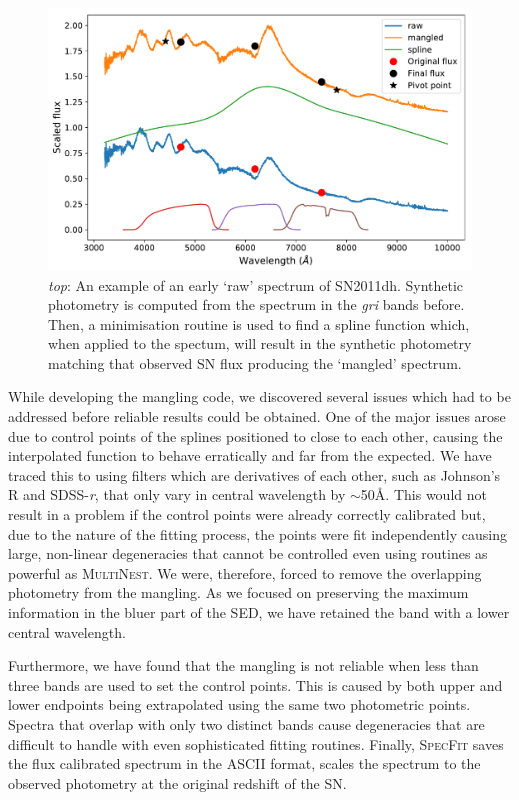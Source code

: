 \begin{figure}
  \centering
  \includegraphics[width=\textwidth]{Figures/Chapter3/Mangling}
  \caption{\textit{top}: An example of an early `raw' spectrum of SN2011dh. Synthetic photometry is computed from the spectrum in the \textit{gri} bands before. Then, a minimisation routine is used to find a spline function which, when applied to the spectum, will result in the synthetic photometry matching that observed SN flux producing the `mangled' spectrum.}
  \label{fig:SpecMangling}
\end{figure}

While developing the mangling code, we discovered several issues which had to be addressed before reliable results could be obtained. One of the major issues arose due to control points of the splines positioned to close to each other, causing the interpolated function to behave erratically and far from the expected. We have traced this to using filters which are derivatives of each other, such as Johnson's R and SDSS-\textit{r}, that only vary in central wavelength by $\sim$50\AA. This would not result in a problem if the control points were already correctly calibrated but, due to the nature of the fitting process, the points were fit independently causing large, non-linear degeneracies that cannot be controlled even using routines as powerful as \textsc{MultiNest}. We were, therefore, forced to remove the overlapping photometry from the mangling. As we focused on preserving the maximum information in the bluer part of the SED, we have retained the band with a lower central wavelength.

Furthermore, we have found that the mangling is not reliable when less than three bands are used to set the control points. This is caused by both upper and lower endpoints being extrapolated using the same two photometric points. Spectra that overlap with only two distinct bands cause degeneracies that are difficult to handle with even sophisticated fitting routines. Finally, \textsc{SpecFit} saves the flux calibrated spectrum in the ASCII format, scales the spectrum to the observed photometry at the original redshift of the SN.

